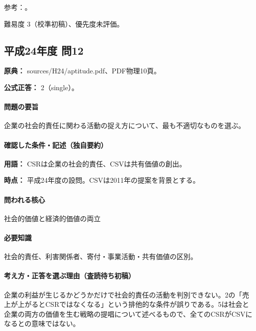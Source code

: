 \par 参考：\cite{iso26000}。

\par 難易度 3（校準初稿）、優先度未評価。

\subsection{平成24年度 問12}
\label{q:h24-reg-apt-12}

\noindent\textbf{原典：} sources/H24/aptitude.pdf、PDF物理10頁。

\textbf{公式正答：} 2（single）。

\paragraph{問題の要旨} 企業の社会的責任に関わる活動の捉え方について、最も不適切なものを選ぶ。

\paragraph{確認した条件・記述（独自要約）}\mbox{}\par

\noindent\textbf{用語：} CSRは企業の社会的責任、CSVは共有価値の創出。\par

\noindent\textbf{時点：} 平成24年度の設問。CSVは2011年の提案を背景とする。\par

\paragraph{問われる核心} 社会的価値と経済的価値の両立

\paragraph{必要知識} 社会的責任、利害関係者、寄付・事業活動・共有価値の区別。

\paragraph{考え方・正答を選ぶ理由（査読待ち初稿）} 企業の利益が生じるかどうかだけで社会的責任の活動を判別できない。2の「売上が上がるとCSRではなくなる」という排他的な条件が誤りである。5は社会と企業の両方の価値を生む戦略の提唱について述べるもので、全てのCSRがCSVになるとの意味ではない。

